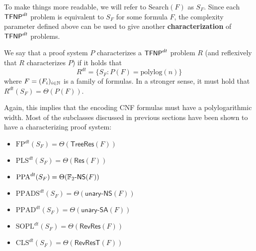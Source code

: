 To make things more readable, we will refer to $\mathrm{Search}(F)$ as $S_F$. Since each $\mathsf{TFNP}^{dt}$ problem is equivalent to $S_F$ for some formula $F$, the complexity parameter defined above can be used to give another \textbf{characterization} of $\mathsf{TFNP}^{dt}$ problems.

\begin{definition}
 We say that a proof system $P$ characterizes a $\mathsf{TFNP}^{dt}$ problem $R$ (and reflexively that $R$ characterizes $P$) if it holds that \[R^{dt} = \{S_F : P(F) = \mathrm{polylog}(n)\}\]
 where $F = (F_i)_{i \in \mathbb{N}}$ is a family of formulas. In a stronger sense, it must hold that $R^{dt}(S_F) = \Theta(P(F))$. 
\end{definition}

Again, this implies that the encoding CNF formulas must have a polylogarithmic width. Most of the \TFNP subclasses discussed in previous sections have been shown to have a characterizing proof system:
\begin{itemize}
    \item $\mathrm{FP}^{dt}(S_F) = \Theta(\mathsf{TreeRes}(F))$ \cite{search_problems_dt_model}
    \item $\mathrm{PLS}^{dt}(S_F) = \Theta(\mathsf{Res}(F))$  \cite{approx_counting}
    \item $\mathrm{PPA}^{dt}(S_F) = \Theta(\mathbb{F}_2\textsf{-NS}(F))$ \cite{adventures_monotone_tfnp}
    \item $\mathrm{PPADS}^{dt}(S_F) = \Theta(\textsf{unary-NS}(F))$ \cite{separations_proof_complexity}
    \item $\mathrm{PPAD}^{dt}(S_F) = \Theta(\textsf{unary-SA}(F))$ \cite{separations_proof_complexity}
    \item $\mathrm{SOPL}^{dt}(S_F) = \Theta(\mathsf{RevRes}(F))$ \cite{separations_proof_complexity}
    \item $\mathrm{CLS}^{dt}(S_F) = \Theta(\mathsf{RevResT}(F))$ \cite{separations_proof_complexity}
\end{itemize}

